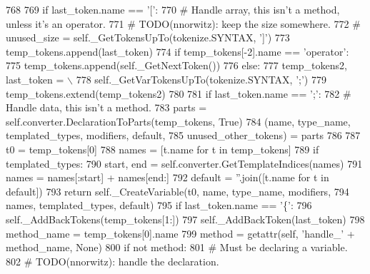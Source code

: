 \begin{DoxyCode}
768 
769             \textcolor{keywordflow}{if} last\_token.name == \textcolor{stringliteral}{'['}:
770                 \textcolor{comment}{# Handle array, this isn't a method, unless it's an operator.}
771                 \textcolor{comment}{# TODO(nnorwitz): keep the size somewhere.}
772                 \textcolor{comment}{# unused\_size = self.\_GetTokensUpTo(tokenize.SYNTAX, ']')}
773                 temp\_tokens.append(last\_token)
774                 \textcolor{keywordflow}{if} temp\_tokens[-2].name == \textcolor{stringliteral}{'operator'}:
775                     temp\_tokens.append(self.\_GetNextToken())
776                 \textcolor{keywordflow}{else}:
777                     temp\_tokens2, last\_token = \(\backslash\)
778                         self.\_GetVarTokensUpTo(tokenize.SYNTAX, \textcolor{stringliteral}{';'})
779                     temp\_tokens.extend(temp\_tokens2)
780 
781             \textcolor{keywordflow}{if} last\_token.name == \textcolor{stringliteral}{';'}:
782                 \textcolor{comment}{# Handle data, this isn't a method.}
783                 parts = self.converter.DeclarationToParts(temp\_tokens, \textcolor{keyword}{True})
784                 (name, type\_name, templated\_types, modifiers, default,
785                  unused\_other\_tokens) = parts
786 
787                 t0 = temp\_tokens[0]
788                 names = [t.name \textcolor{keywordflow}{for} t \textcolor{keywordflow}{in} temp\_tokens]
789                 \textcolor{keywordflow}{if} templated\_types:
790                     start, end = self.converter.GetTemplateIndices(names)
791                     names = names[:start] + names[end:]
792                 default = \textcolor{stringliteral}{''}.join([t.name \textcolor{keywordflow}{for} t \textcolor{keywordflow}{in} default])
793                 \textcolor{keywordflow}{return} self.\_CreateVariable(t0, name, type\_name, modifiers,
794                                             names, templated\_types, default)
795             \textcolor{keywordflow}{if} last\_token.name == \textcolor{stringliteral}{'\{'}:
796                 self.\_AddBackTokens(temp\_tokens[1:])
797                 self.\_AddBackToken(last\_token)
798                 method\_name = temp\_tokens[0].name
799                 method = getattr(self, \textcolor{stringliteral}{'handle\_'} + method\_name, \textcolor{keywordtype}{None})
800                 \textcolor{keywordflow}{if} \textcolor{keywordflow}{not} method:
801                     \textcolor{comment}{# Must be declaring a variable.}
802                     \textcolor{comment}{# TODO(nnorwitz): handle the declaration.}

\end{DoxyCode}
